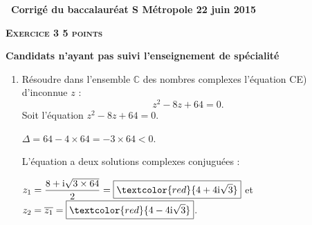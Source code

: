 \documentclass[12pt]{article}
\newcommand{\C}{\mathbb{C}}
\begin{document}
\setlength\parindent{0mm}
\renewcommand \footrulewidth{.2pt}
\pagestyle{fancy}
\thispagestyle{empty}
\begin{center} {\large{\textbf{\decofourleft~Corrigé du baccalauréat S  Métropole 22 juin 2015~\decofourright
}}} 

\end{center}

\vspace{0,5cm}

\textbf{\textsc{Exercice 3 \hfill 5 points}}

\textbf{Candidats n'ayant pas suivi l'enseignement de spécialité} 

\medskip

\begin{enumerate}
\item Résoudre dans l'ensemble $\C$ des nombres complexes l'équation CE) d'inconnue $z$ :
\[z^2 - 8z + 64 = 0.\]
Soit l'équation $z^2 - 8z + 64 = 0$.

\noindent $\Delta=64-4\times 64=-3\times 64<0$.

\noindent L'équation a deux solutions complexes conjuguées :

\noindent $z_1=\dfrac{8+\mathrm{i}\sqrt{3\times 64}}{2}=\boxed{\textcolor{red}{4+4\mathrm{i}\sqrt{3}}}$ et $z_2=\overline{z_1}=\boxed{\textcolor{red}{4-4\mathrm{i}\sqrt{3}}}$.

\end{enumerate}
\end{document}

